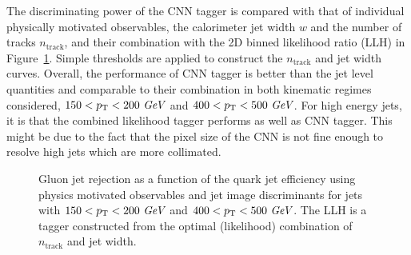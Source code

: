 The discriminating power of the CNN tagger is compared with that of individual physically motivated observables, the calorimeter jet width $w$ and the number of tracks $n_\text{track}$, and their combination with the 2D binned likelihood ratio (LLH) in Figure~\ref{fig:classifiers}.  Simple thresholds are applied to construct the $n_\text{track}$ and jet width curves.  Overall, the performance of CNN tagger is better than the jet level quantities and comparable to their combination in both kinematic regimes considered, $150<p_{{\rm T}}<200~\textit{GeV}$ and $400<p_{{\rm T}}<500~\textit{GeV}$. For high energy jets, it is that the combined likelihood tagger performs as well as CNN tagger. This might be due to the fact that the pixel size of the CNN is not fine enough to resolve high \pt jets which are more collimated. 

\begin{figure}[htpb]
\begin{center}
\caption{Gluon jet rejection as a function of the quark jet efficiency using physics motivated observables and jet image discriminants
for jets with \protect{} $150<p_{{\rm T}}<200~\textit{GeV}$ and \protect{} $400<p_{{\rm T}}<500~\textit{GeV}$.  The LLH is a tagger constructed from the optimal (likelihood) combination of $n_\text{track}$ and jet width. }
\label{fig:classifiers}
\end{center}
\end{figure}

